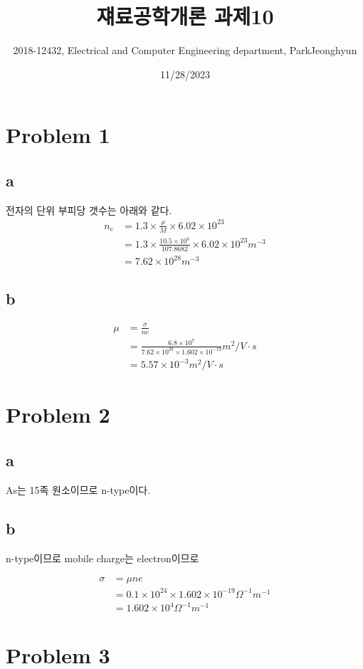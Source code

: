 \documentclass[a4paper]{oblivoir}
\title{쟤료공학개론 과제10}
\author{2018-12432, Electrical and Computer Engineering department, ParkJeonghyun}
\date{11/28/2023}
\begin{document}
\maketitle
\section{Problem 1}
\subsection{a}
전자의 단위 부피당 갯수는 아래와 같다.
\begin{align}
	n_{e} &= 1.3\times \frac{\rho}{M}\times 6.02 \times 10^{23}\\
	&= 1.3\times \frac{10.5\times10^{6}}{107.8682}\times 6.02 \times 10^{23} m^{-3}\\
	&= 7.62 \times 10^{28} m^{-3}
\end{align}

\subsection{b}
\begin{align}
	\mu &= \frac{\sigma}{ne}\\
	&= \frac{6.8\times 10^{7}}{7.62 \times 10^{28} \times 1.602 \times 10^{-19}} m^{2} /V\cdot s\\
	&= 5.57\times 10^{-3} m^{2} /V\cdot s
\end{align}

\section{Problem 2}
\subsection{a}
As는 15족 원소이므로 n-type이다.

\subsection{b}
n-type이므로 mobile charge는 electron이므로 

\begin{align}
	\sigma &= \mu n e\\
	&= 0.1 \times 10^{24}\times 1.602\times10^{-19} \Omega^{-1} m^{-1}\\
	&= 1.602\times 10^{4}\Omega^{-1} m^{-1}
\end{align}

\section{Problem 3}
\end{document}
